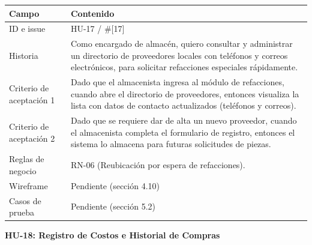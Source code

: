 {\def\LTcaptype{none} %
\begin{longtable}[]{@{}
  >{\raggedright\arraybackslash}p{}
  >{\raggedright\arraybackslash}p{}@{}}
\toprule\noalign{}
\begin{minipage}[b]{\linewidth}\raggedright
\textbf{Campo}
\end{minipage} & \begin{minipage}[b]{\linewidth}\raggedright
\textbf{Contenido}
\end{minipage} \\
\midrule\noalign{}
\endhead
\bottomrule\noalign{}
\endlastfoot
ID e issue & HU-17 / \#{[}17{]} \\
Historia & Como encargado de almacén, quiero consultar y administrar un
directorio de proveedores locales con teléfonos y correos electrónicos,
para solicitar refacciones especiales rápidamente. \\
Criterio de aceptación 1 & Dado que el almacenista ingresa al módulo de
refacciones, cuando abre el directorio de proveedores, entonces
visualiza la lista con datos de contacto actualizados (teléfonos y
correos). \\
Criterio de aceptación 2 & Dado que se requiere dar de alta un nuevo
proveedor, cuando el almacenista completa el formulario de registro,
entonces el sistema lo almacena para futuras solicitudes de piezas. \\
Reglas de negocio & RN-06 (Reubicación por espera de refacciones). \\
Wireframe & Pendiente (sección 4.10) \\
Casos de prueba & Pendiente (sección 5.2) \\
\end{longtable}
}

\textbf{HU-18: Registro de Costos e Historial de Compras}


